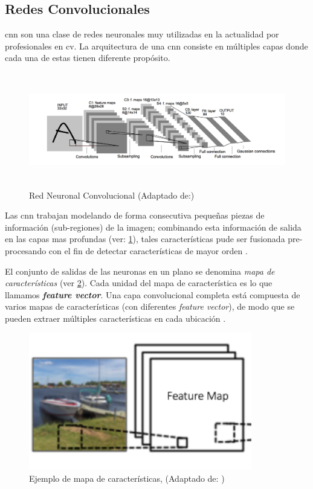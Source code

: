 \subsection{Redes Convolucionales}\label{sub:cnn}
\ac{cnn} son una clase de redes neuronales muy utilizadas en la actualidad por profesionales en \ac{cv}. La arquitectura de una \ac{cnn} consiste en múltiples capas donde cada una de estas tienen diferente propósito.

\begin{figure}[h]
 \centering
  \includegraphics[height=5cm,keepaspectratio=true,clip=true]{imagenes/Logos/cnnconv.png}
  \caption{Red Neuronal Convolucional (Adaptado de:\citep{cnns})}
	\label{Fig: redconvolucion}
\end{figure}

Las \ac{cnn} trabajan modelando de forma consecutiva pequeñas piezas de información (sub-regiones) de la imagen; combinando esta información de salida en las capas mas profundas (ver: \ref{Fig: redconvolucion}), tales características pude ser fusionada pre-procesando con el fin de detectar características de mayor orden \citep{murphy}.


El conjunto de salidas de las neuronas en un plano se denomina \textit{mapa de características} (ver \ref{Fig: fmaps}). Cada unidad  del mapa de característica es lo que llamamos  \textit{\textbf{feature vector}}. Una capa convolucional completa está compuesta de varios mapas de características (con diferentes 
\textit{feature vector}), de modo que se pueden extraer múltiples características en cada ubicación \citep{cnns}.

\begin{figure}[H]
 \centering
  \includegraphics[height=6cm,keepaspectratio=true,clip=true]{imagenes/Logos/fmaps.png}
  \caption{Ejemplo de mapa de características, (Adaptado de: \citep{cnnsarticle})}
	\label{Fig: fmaps}
\end{figure}

